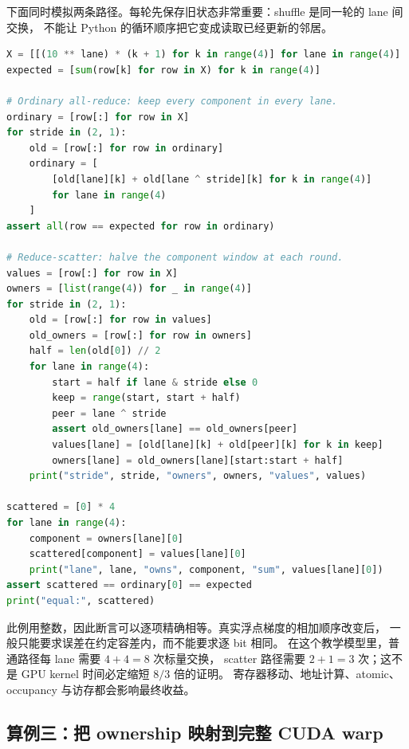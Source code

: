 下面同时模拟两条路径。每轮先保存旧状态非常重要：shuffle 是同一轮的 lane 间交换，
不能让 Python 的循环顺序把它变成读取已经更新的邻居。
\begin{lstlisting}[language=Python]
X = [[(10 ** lane) * (k + 1) for k in range(4)] for lane in range(4)]
expected = [sum(row[k] for row in X) for k in range(4)]

# Ordinary all-reduce: keep every component in every lane.
ordinary = [row[:] for row in X]
for stride in (2, 1):
    old = [row[:] for row in ordinary]
    ordinary = [
        [old[lane][k] + old[lane ^ stride][k] for k in range(4)]
        for lane in range(4)
    ]
assert all(row == expected for row in ordinary)

# Reduce-scatter: halve the component window at each round.
values = [row[:] for row in X]
owners = [list(range(4)) for _ in range(4)]
for stride in (2, 1):
    old = [row[:] for row in values]
    old_owners = [row[:] for row in owners]
    half = len(old[0]) // 2
    for lane in range(4):
        start = half if lane & stride else 0
        keep = range(start, start + half)
        peer = lane ^ stride
        assert old_owners[lane] == old_owners[peer]
        values[lane] = [old[lane][k] + old[peer][k] for k in keep]
        owners[lane] = old_owners[lane][start:start + half]
    print("stride", stride, "owners", owners, "values", values)

scattered = [0] * 4
for lane in range(4):
    component = owners[lane][0]
    scattered[component] = values[lane][0]
    print("lane", lane, "owns", component, "sum", values[lane][0])
assert scattered == ordinary[0] == expected
print("equal:", scattered)
\end{lstlisting}

此例用整数，因此断言可以逐项精确相等。真实浮点梯度的相加顺序改变后，
一般只能要求误差在约定容差内，而不能要求逐 bit 相同。
在这个教学模型里，普通路径每 lane 需要 \(4+4=8\) 次标量交换，
scatter 路径需要 \(2+1=3\) 次；这不是 GPU kernel 时间必定缩短 \(8/3\) 倍的证明。
寄存器移动、地址计算、atomic、occupancy 与访存都会影响最终收益。

\subsection{算例三：把 ownership 映射到完整 CUDA warp}

